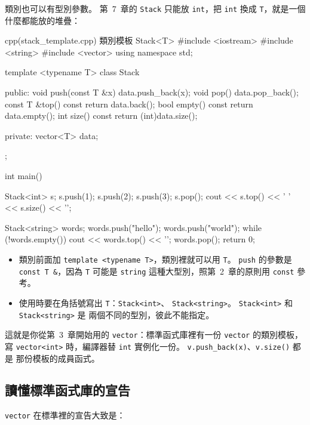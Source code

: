 類別也可以有型別參數。 第~7~章的 \texttt{Stack} 只能放 \texttt{int}，把
\texttt{int} 換成 \texttt{T}，就是一個什麼都能放的堆疊：

\begin{example}[label=ex:stack-template]{cpp}{(stack\_template.cpp) 類別模板 Stack<T>}
#include <iostream>
#include <string>
#include <vector>
using namespace std;

template <typename T>
class Stack {
public:
    void push(const T &x) { data.push_back(x); }
    void pop() { data.pop_back(); }
    const T &top() const { return data.back(); }
    bool empty() const { return data.empty(); }
    int size() const { return (int)data.size(); }

private:
    vector<T> data;
};

int main() {
    Stack<int> s;
    s.push(1);
    s.push(2);
    s.push(3);
    s.pop();
    cout << s.top() << ' ' << s.size() << '\n';

    Stack<string> words;
    words.push("hello");
    words.push("world");
    while (!words.empty()) {
        cout << words.top() << '\n';
        words.pop();
    }
    return 0;
}
\end{example}


\begin{itemize}
\item 類別前面加 \texttt{template <typename T>}，類別裡就可以用
\texttt{T}。 \texttt{push} 的參數是 \texttt{const T \&}，因為 \texttt{T}
可能是 \texttt{string} 這種大型別，照第~2~章的原則用 \texttt{const} 參考。
\item 使用時要在角括號寫出 \texttt{T}：\texttt{Stack<int>}、
\texttt{Stack<string>}。 \texttt{Stack<int>} 和 \texttt{Stack<string>} 是
兩個不同的型別，彼此不能指定。
\end{itemize}

這就是你從第~3~章開始用的 \texttt{vector}：標準函式庫裡有一份
\texttt{vector} 的類別模板，寫 \texttt{vector<int>} 時，編譯器替
\texttt{int} 實例化一份。 \texttt{v.push\_back(x)}、\texttt{v.size()} 都是
那份模板的成員函式。

\subsection{讀懂標準函式庫的宣告}

\texttt{vector} 在標準裡的宣告大致是：

